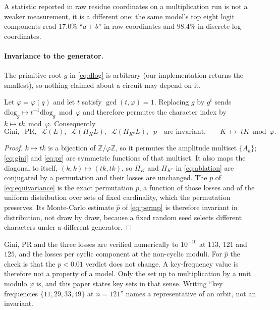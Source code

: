 A statistic reported in raw residue coordinates on a multiplication run is not a weaker
measurement, it is a different one: the same model's top eight logit components read $17.0\%$ ``$a+b$'' in raw coordinates
and $98.4\%$ in discrete-log coordinates.

\paragraph{Invariance to the generator.} The primitive root $g$ in \eqref{eq:dlog} is
arbitrary (our implementation returns the smallest), so nothing claimed about a circuit
may depend on it.

\begin{proposition}
\label{prop:generator}
Let $\varphi = \varphi(q)$ and let $t$ satisfy $\gcd(t, \varphi) = 1$. Replacing $g$ by $g^{t}$
sends $\mathrm{dlog}_{g} \mapsto t^{-1} \mathrm{dlog}_{g} \bmod \varphi$ and therefore permutes
the character index by $k \mapsto t k \bmod \varphi$. Consequently
\begin{equation}
  \label{eq:equivariance}
  \mathrm{Gini},\;\; \mathrm{PR},\;\;
  \mathcal{L}(L),\;\; \mathcal{L}(\Pi_{K} L),\;\; \mathcal{L}(\Pi_{K^{c}} L),\;\; p
  \quad\text{are invariant,}
  \qquad
  K \;\longmapsto\; tK \bmod \varphi .
\end{equation}
\end{proposition}

\begin{proof}
$k \mapsto tk$ is a bijection of $\mathbb{Z}/\varphi\mathbb{Z}$, so it permutes the amplitude
multiset $\{A_{k}\}$; \eqref{eq:gini} and \eqref{eq:pr} are symmetric functions of that
multiset. It also maps the diagonal to itself, $(k,k) \mapsto (tk, tk)$, so $\Pi_{K}$ and
$\Pi_{K^{c}}$ in \eqref{eq:ablation} are conjugated by a permutation and their losses are
unchanged. The $p$ of \eqref{eq:equivariance} is the exact permutation $p$, a function of those
losses and of the uniform distribution over sets of fixed cardinality, which the permutation
preserves. Its Monte-Carlo estimate $\hat{p}$ of \eqref{eq:permp} is therefore invariant in
distribution, not draw by draw, because a fixed random seed selects different characters
under a different generator.
\end{proof}

Gini, PR and the three losses are verified numerically to $10^{-10}$ at $113$, $121$ and $125$,
and the losses per cyclic component at the non-cyclic moduli. For $\hat{p}$ the check is that
the $p < 0.01$ verdict does not change. A key-frequency value is therefore not a property of a model. Only
the set up to multiplication by a unit modulo $\varphi$ is, and this paper states key sets in
that sense. Writing ``key frequencies $\{11, 29, 33, 49\}$ at $n = 121$'' names a representative of an orbit, not
an invariant.

